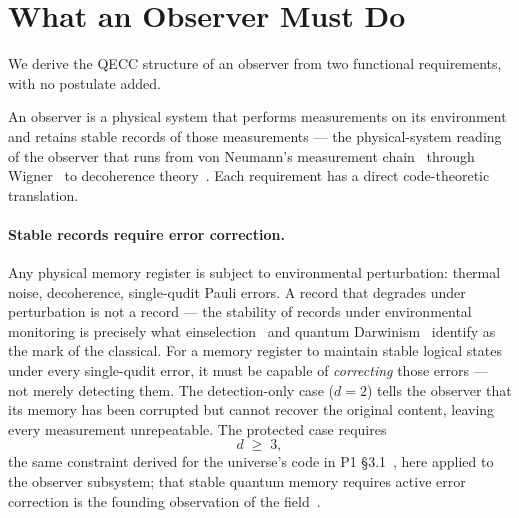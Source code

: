 \documentclass[11pt,a4paper]{article}
\begin{document}
\section{What an Observer Must Do}
\label{sec:what_obs}

We derive the QECC structure of an observer from two functional requirements, with no postulate added.

An observer is a physical system that performs measurements on its environment and retains stable records of those measurements --- the physical-system reading of the observer that runs from von Neumann's measurement chain~\cite{vNeumannQM} through Wigner~\cite{Wigner1961} to decoherence theory~\cite{Zurek2003}. Each requirement has a direct code-theoretic translation.

\paragraph{Stable records require error correction.}
Any physical memory register is subject to environmental perturbation: thermal noise, decoherence, single-qudit Pauli errors. A record that degrades under perturbation is not a record --- the stability of records under environmental monitoring is precisely what einselection~\cite{Zurek2003} and quantum Darwinism~\cite{Zurek2009} identify as the mark of the classical. For a memory register to maintain stable logical states under every single-qudit error, it must be capable of \emph{correcting} those errors --- not merely detecting them. The detection-only case ($d=2$) tells the observer that its memory has been corrupted but cannot recover the original content, leaving every measurement unrepeatable. The protected case requires
\begin{equation}
  d \;\geq\; 3,
  \label{eq:d3_obs}
\end{equation}
the same constraint derived for the universe's code in P1 \S3.1~\cite{Hubka2026QSD}, here applied to the observer subsystem; that stable quantum memory requires active error correction is the founding observation of the field~\cite{Shor1995,Steane1996}.
\end{document}
